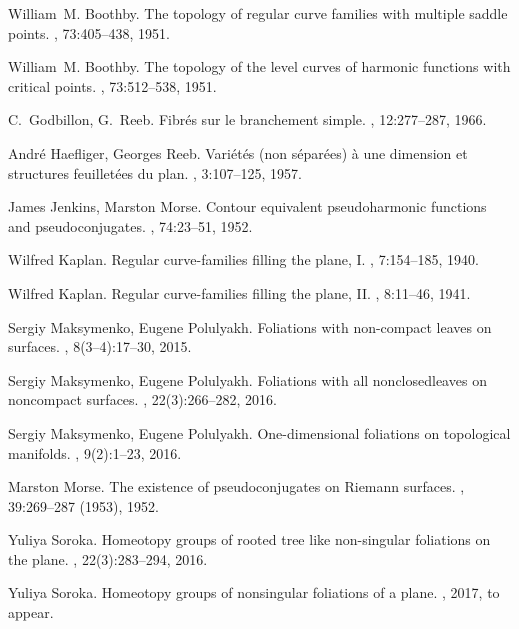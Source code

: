 \documentclass[12pt, reqno]{amsart}
\begin{document}
\begin{thebibliography}{10}

William~M. Boothby.
\newblock The topology of regular curve families with multiple saddle points.
, 73:405--438, 1951.

William~M. Boothby.
\newblock The topology of the level curves of harmonic functions with critical
  points.
, 73:512--538, 1951.

C.~Godbillon, G.~Reeb.
\newblock Fibr\'es sur le branchement simple.
, 12:277--287, 1966.

Andr{\'e} Haefliger, Georges Reeb.
\newblock Vari\'et\'es (non s\'epar\'ees) \`a une dimension et structures
  feuillet\'ees du plan.
, 3:107--125, 1957.

James Jenkins, Marston Morse.
\newblock Contour equivalent pseudoharmonic functions and pseudoconjugates.
, 74:23--51, 1952.

Wilfred Kaplan.
\newblock Regular curve-families filling the plane, {I}.
, 7:154--185, 1940.

Wilfred Kaplan.
\newblock Regular curve-families filling the plane, {II}.
, 8:11--46, 1941.

Sergiy Maksymenko, Eugene Polulyakh.
\newblock Foliations with non-compact leaves on surfaces.
, 8(3--4):17--30, 2015.

Sergiy Maksymenko, Eugene Polulyakh.
\newblock Foliations with all non­closedleaves on non­compact surfaces.
, 22(3):266--282, 2016.

Sergiy Maksymenko, Eugene Polulyakh.
\newblock One-dimensional foliations on topological manifolds.
, 9(2):1--23, 2016.

Marston Morse.
\newblock The existence of pseudoconjugates on {R}iemann surfaces.
, 39:269--287 (1953), 1952.

Yuliya Soroka.
\newblock Homeotopy groups of rooted tree like non-singular foliations on the
  plane.
, 22(3):283--294, 2016.

Yuliya Soroka.
\newblock Homeotopy groups of nonsingular foliations of a plane.
, 2017, to appear.

\end{thebibliography}
\end{document}
